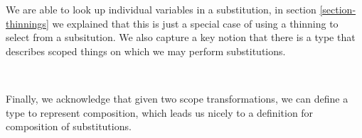 We are able to look up individual variables in a substitution, in section
\ref{section-thinnings} we explained that this is just a special case of
using a thinning to select from a subsitution. We also capture a key notion
that there is a type that describes scoped things on which we may perform
substitutions.
\begin{code}%
\>[0]\AgdaSpace{}%
\AgdaSymbol{:}\AgdaSpace{}%
\AgdaSpace{}%
\AgdaSpace{}%
\<%
\\
\>[0]\AgdaSpace{}%
\AgdaSpace{}%
\AgdaSymbol{=}\AgdaSpace{}%
\AgdaSpace{}%
\AgdaSymbol{\{}\AgdaSymbol{\}}\AgdaSpace{}%
\AgdaSymbol{\{}\AgdaSymbol{\}}\AgdaSpace{}%
\AgdaSpace{}%
\AgdaSpace{}%
\AgdaSpace{}%
\AgdaSpace{}%
\AgdaSpace{}%
\AgdaOperator{\AgdaFunction{⇒[}}\AgdaSpace{}%
\AgdaSpace{}%
\AgdaOperator{\AgdaFunction{]}}\AgdaSpace{}%
\AgdaSpace{}%
\AgdaSpace{}%
\AgdaSpace{}%
\<%
\end{code}
Finally, we acknowledge that given two scope transformations, we can define
a type to represent composition, which leads us nicely to a definition for
composition of substitutions.

